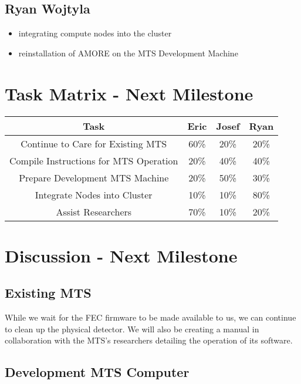 \documentclass[12pt]{article}
\newcommand\tab[1][1cm]{\hspace*{#1}}
\begin{document}
\subsection{Ryan Wojtyla}

\begin{itemize}
\item integrating compute nodes into the cluster
\item reinstallation of AMORE on the MTS Development Machine
\end{itemize}

\section{Task Matrix - Next Milestone}

\begin{center}
  \begin{tabular}{|c|c|c|c|}
    \hline
    Task & Eric & Josef & Ryan \\
    \hline
    Continue to Care for Existing MTS & 60\% & 20\% & 20\% \\
    Compile Instructions for MTS Operation & 20\% & 40\% & 40\% \\
    Prepare Development MTS Machine & 20\% & 50\% & 30\% \\
    Integrate Nodes into Cluster & 10\% & 10\% & 80\% \\
    Assist Researchers & 70\% & 10\% & 20\% \\
    \hline
  \end{tabular}
\end{center}

\section{Discussion - Next Milestone}

\subsection{Existing MTS}

\tab While we wait for the FEC firmware to be made available to us, we can
continue to clean up the physical detector. We will also be creating a manual
in collaboration with the MTS's researchers detailing the operation of its
software.

\subsection{Development MTS Computer}
\end{document}
